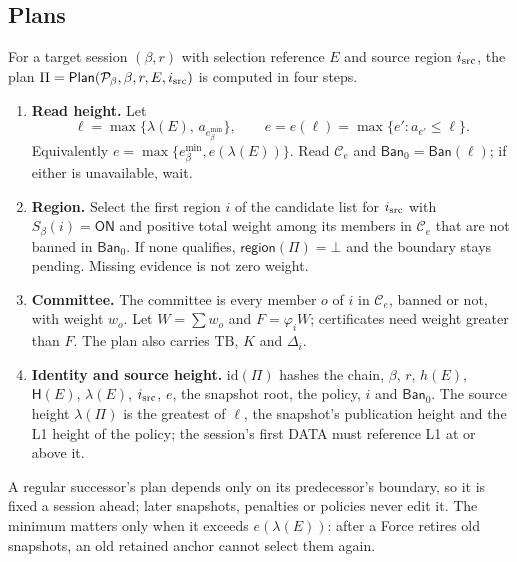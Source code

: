 \documentclass[11pt,a4paper]{article}
\newcommand{\Hash}{\mathsf H}
\newcommand{\tagg}[1]{\mathsf{#1}}
\newcommand{\cfg}{\mathcal C}
\newcommand{\Ban}{\mathsf{Ban}}
\newcommand{\emin}{e^{\min}}
\begin{document}
\subsection{Plans}
\label{sec:plan}
For a target session $(\beta,r)$ with selection reference $E$ and source
region $i_{\rm src}$, the plan
$\Pi=\tagg{Plan}(\mathcal P_\beta,\beta,r,E,i_{\rm src})$ is computed in
four steps.
\begin{enumerate}[label=\textbf{\arabic*.},itemsep=3pt]
\item \textbf{Read height.} Let
\begin{equation}\label{eq:read}
 \ell=\max\{\lambda(E),\,a_{\emin_\beta}\},\qquad
 e=e(\ell)=\max\{e':a_{e'}\le\ell\}.
\end{equation}
Equivalently $e=\max\{\emin_\beta,e(\lambda(E))\}$. Read $\cfg_e$ and
$\Ban_0=\Ban(\ell)$; if either is unavailable, wait.
\item \textbf{Region.} Select the first region $i$ of the candidate list
for $i_{\rm src}$ with
$S_\beta(i)=\tagg{ON}$ and positive total weight among its members in
$\cfg_e$ that are not banned in $\Ban_0$. If none qualifies,
$\tagg{region}(\Pi)=\bot$ and the boundary stays pending. Missing evidence
is not zero weight.
\item \textbf{Committee.} The committee is every member $o$ of $i$ in
$\cfg_e$, banned or not, with weight $w_o$. Let $W=\sum w_o$ and
$F=\varphi_iW$; certificates need weight greater than $F$. The plan also
carries $\mathrm{TB}$, $K$ and $\Delta_i$.
\item \textbf{Identity and source height.} $\mathrm{id}(\Pi)$ hashes the
chain, $\beta$, $r$, $h(E)$, $\Hash(E)$, $\lambda(E)$,
$i_{\rm src}$, $e$, the snapshot root, the policy, $i$ and $\Ban_0$. The
source height $\lambda(\Pi)$ is the greatest of $\ell$, the snapshot's
publication height and the L1 height of the policy; the session's first
DATA must reference L1 at or above it.
\end{enumerate}
A regular successor's plan depends only on its predecessor's boundary,
so it is fixed a session ahead; later snapshots, penalties or policies
never edit it. The minimum matters only when it exceeds $e(\lambda(E))$:
after a Force retires old snapshots, an old retained anchor cannot select
them again.
\end{document}
